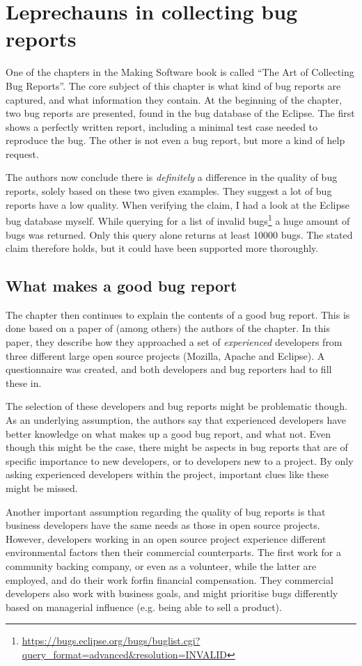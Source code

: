 \chapter{Leprechauns in collecting bug reports}
One of the chapters in the Making Software book \cite{makingsoftware} is called ``The Art of Collecting Bug Reports''.
The core subject of this chapter is what kind of bug reports are captured, and what information they contain.
At the beginning of the chapter, two bug reports are presented, found in the bug database of the Eclipse. 
The first shows a perfectly written report, including a minimal test case needed to reproduce the bug.
The other is not even a bug report, but more a kind of help request. 

The authors now conclude there is \emph{definitely} a difference in the quality of bug reports, solely based on these two given examples.
They suggest a lot of bug reports have a low quality.
When verifying the claim, I had a look at the Eclipse bug database myself. 
While querying for a list of invalid bugs\footnote{\url{https://bugs.eclipse.org/bugs/buglist.cgi?query_format=advanced&resolution=INVALID}} a huge amount of bugs was returned.
Only this query alone returns at least 10000 bugs.
The stated claim therefore holds, but it could have been supported more thoroughly.

\section{What makes a good bug report}
The chapter then continues to explain the contents of a good bug report. 
This is done based on a paper \cite{Bettenburg:2008:MGB:1453101.1453146} of (among others) the authors of the chapter. 
In this paper, they describe how they approached a set of \emph{experienced} developers from three different large open source projects (Mozilla, Apache and Eclipse).
A questionnaire was created, and both developers and bug reporters had to fill these in.

The selection of these developers and bug reports might be problematic though. 
As an underlying assumption, the authors say that experienced developers have better knowledge on what makes up a good bug report, and what not. 
Even though this might be the case, there might be aspects in bug reports that are of specific importance to new developers, or to developers new to a project. 
By only asking experienced developers within the project, important clues like these might be missed.

Another important assumption regarding the quality of bug reports is that business developers have the same needs as those in open source projects.
However, developers working in an open source project experience different environmental factors then their commercial counterparts. 
The first work for a community backing company, or even as a volunteer, while the latter are employed, and do their work forfin financial compensation. 
They commercial developers also work with business goals, and might prioritise bugs differently based on managerial influence (e.g. being able to sell a product).

